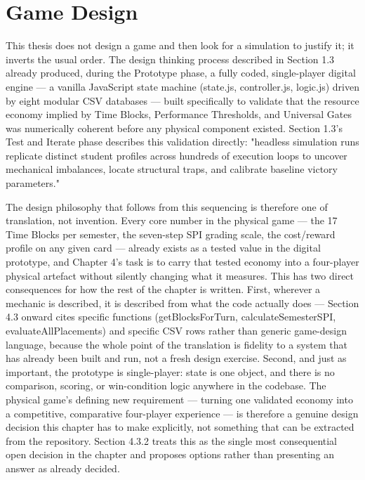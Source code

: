 \section{Game Design}

This thesis does not design a game and then look for a simulation to justify it; it inverts the usual order. The design thinking process described in Section 1.3 already produced, during the Prototype phase, a fully coded, single-player digital engine --- a vanilla JavaScript state machine (state.js, controller.js, logic.js) driven by eight modular CSV databases --- built specifically to validate that the resource economy implied by Time Blocks, Performance Thresholds, and Universal Gates was numerically coherent before any physical component existed. Section 1.3's Test and Iterate phase describes this validation directly: "headless simulation runs replicate distinct student profiles across hundreds of execution loops to uncover mechanical imbalances, locate structural traps, and calibrate baseline victory parameters."

The design philosophy that follows from this sequencing is therefore one of translation, not invention. Every core number in the physical game --- the 17 Time Blocks per semester, the seven-step SPI grading scale, the cost/reward profile on any given card --- already exists as a tested value in the digital prototype, and Chapter 4's task is to carry that tested economy into a four-player physical artefact without silently changing what it measures. This has two direct consequences for how the rest of the chapter is written. First, wherever a mechanic is described, it is described from what the code actually does --- Section 4.3 onward cites specific functions (getBlocksForTurn, calculateSemesterSPI, evaluateAllPlacements) and specific CSV rows rather than generic game-design language, because the whole point of the translation is fidelity to a system that has already been built and run, not a fresh design exercise. Second, and just as important, the prototype is single-player: state is one object, and there is no comparison, scoring, or win-condition logic anywhere in the codebase. The physical game's defining new requirement --- turning one validated economy into a competitive, comparative four-player experience --- is therefore a genuine design decision this chapter has to make explicitly, not something that can be extracted from the repository. Section 4.3.2 treats this as the single most consequential open decision in the chapter and proposes options rather than presenting an answer as already decided.

